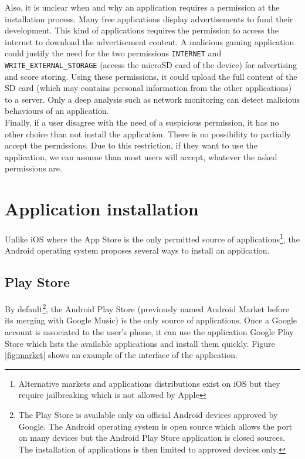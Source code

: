 Also, it is unclear when and why an application requires a permission at the installation process.
Many free applications display advertisements to fund their development.
This kind of applications requires the permission to access the internet to download the advertisement content.
A malicious gaming application could justify the need for the two permissions \texttt{INTERNET} and \texttt{WRITE\_EXTERNAL\_STORAGE} (access the microSD card of the device) for advertising and score storing.
Using these permissions, it could upload the full content of the SD card (which may contains personal information from the other applications) to a server.
Only a deep analysis such as network monitoring can detect malicious behaviours of an application.\\

Finally, if a user disagree with the need of a suspicious permission, it has no other choice than not install the application.
There is no possibility to partially accept the permissions.
Due to this restriction, if they want to use the application, we can assume than most users will accept, whatever the asked permissions are.

\section{Application installation}

Unlike iOS where the App Store is the only permitted source of applications\footnote{Alternative markets and applications distributions exist on iOS but they require jailbreaking which is not allowed by Apple}, the Android operating system proposes several ways to install an application.

\subsection{Play Store}
By default\footnote{The Play Store is available only on official Android devices approved by Google. The Android operating system is open source which allows the port on many devices but the Android Play Store application is closed sources. The installation of applications is then limited to approved devices only.}, the Android Play Store (previously named Android Market before its merging with Google Music) is the only source of applications.
Once a Google account is associated to the user's phone, it can use the application Google Play Store which lists the available applications and install them quickly.
Figure \ref{fig:market} shows an example of the interface of the application.\\


